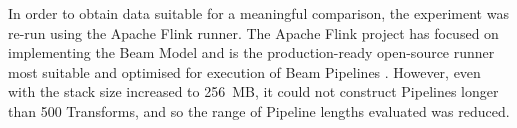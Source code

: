 In order to obtain data suitable for a meaningful comparison, the experiment was re-run using the Apache Flink \cite{ApacheFlinkRunner} runner.
The Apache Flink project has focused on implementing the Beam Model and is the production-ready open-source runner most suitable and optimised for execution of Beam Pipelines \cite{ApacheFlinkFocus}.
However, even with the stack size increased to \SI{256}{MB}, it could not construct Pipelines longer than \pmark\num{500} Transforms, and so the range of Pipeline lengths evaluated was reduced.

\begin{figure}
    \centering
	

\end{figure}

